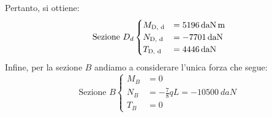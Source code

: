 Pertanto, si ottiene:
\begin{equation*}
\text{Sezione } D_{d} 
\begin{cases}
M_{\textup{D, d}} &=  \SI{5196}{daN.m} \\
N_{\textup{D, d}} &=  -\SI{7701}{daN} \\
T_{\textup{D, d}} & = \SI{4446}{daN}
\end{cases}
\end{equation*}
Infine, per la sezione $B$ andiamo a considerare l'unica forza che segue:
\begin{equation*}
\text{Sezione } B 
\begin{cases}
M_{B} &= 0 \\
N_{B} &= -\frac{7}{8}qL =  -\SI{10500}{daN} \\
T_{B} & = 0
\end{cases}
\end{equation*}
